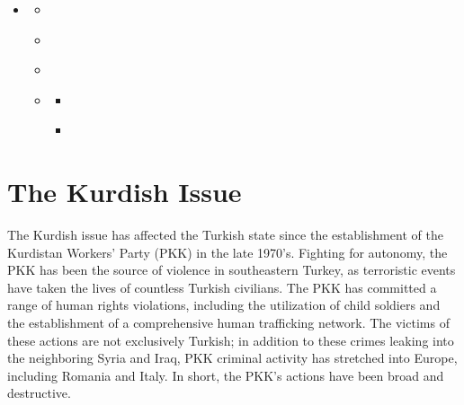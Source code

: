 \documentclass[letterpaper,10pt,english]{sphinxmanual}
\begin{document}
\begin{sphinxShadowBox}
\begin{itemize}
\item {} 
\sphinxAtStartPar
{}\label{\detokenize{introduction:id1}}{\hyperref[\detokenize{introduction:introduction}]{}}
\begin{itemize}
\item {} 
\sphinxAtStartPar
{}\label{\detokenize{introduction:id2}}{\hyperref[\detokenize{introduction:the-kurdish-issue}]{}}

\item {} 
\sphinxAtStartPar
{}\label{\detokenize{introduction:id3}}{\hyperref[\detokenize{introduction:the-turkish-issue}]{}}

\item {} 
\sphinxAtStartPar
{}\label{\detokenize{introduction:id4}}{\hyperref[\detokenize{introduction:intent-of-research}]{}}

\item {} 
\sphinxAtStartPar
{}\label{\detokenize{introduction:id5}}{\hyperref[\detokenize{introduction:the-data}]{}}
\begin{itemize}
\item {} 
\sphinxAtStartPar
{}\label{\detokenize{introduction:id6}}{\hyperref[\detokenize{introduction:scope}]{}}

\item {} 
\sphinxAtStartPar
{}\label{\detokenize{introduction:id7}}{\hyperref[\detokenize{introduction:coding-procedure}]{}}

\end{itemize}

\end{itemize}

\end{itemize}
\end{sphinxShadowBox}


\section{The Kurdish Issue}
\label{\detokenize{introduction:the-kurdish-issue}}
\sphinxAtStartPar
The Kurdish issue has affected the Turkish state since the establishment of the Kurdistan Workers’ Party (PKK) in the late 1970’s. Fighting for autonomy, the PKK has been the source of violence in southeastern Turkey, as terroristic events have taken the lives of countless Turkish civilians. The PKK has committed a range of human rights violations, including the utilization of child soldiers and the establishment of a comprehensive human trafficking network. The victims of these actions are not exclusively Turkish; in addition to these crimes leaking into the neighboring Syria and Iraq, PKK criminal activity has stretched into Europe, including Romania and Italy. In short, the PKK’s actions have been broad and destructive.
\end{document}
